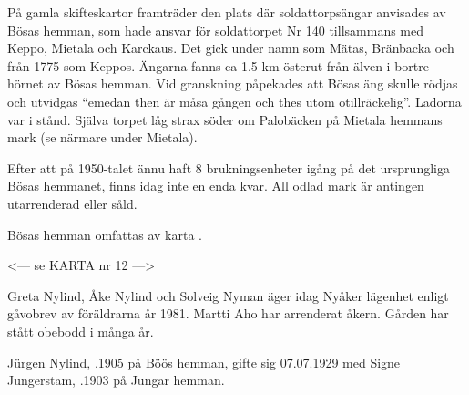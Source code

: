På gamla skifteskartor framträder den plats där soldattorpsängar anvisades av Bösas hemman, som hade ansvar för soldattorpet Nr 140 tillsammans med Keppo, Mietala och Karckaus. Det gick under namn som Mätas, Bränbacka och från 1775 som Keppos. Ängarna fanns ca 1.5 km österut från älven i bortre hörnet av Bösas hemman. Vid granskning påpekades att Bösas äng skulle rödjas och utvidgas ``emedan then är måsa gången och thes utom otillräckelig''. Ladorna var i stånd. Själva torpet låg strax söder om Palobäcken på Mietala hemmans mark (se närmare under Mietala).

Efter att på 1950-talet ännu haft 8 brukningsenheter igång på det ursprungliga Bösas hemmanet, finns idag inte en enda kvar. All odlad  mark är antingen  utarrenderad eller såld.

Bösas hemman omfattas av karta .

<--- se KARTA nr 12 --->



%


%
Greta Nylind, Åke Nylind och Solveig Nyman äger idag Nyåker lägenhet enligt gåvobrev av föräldrarna år 1981.
Martti Aho har arrenderat åkern. Gården har stått obebodd i många år.



%
Jürgen Nylind, .1905 på Böös hemman, gifte sig 07.07.1929 med Signe Jungerstam, .1903 på Jungar hemman.
\begin{jhchildren}
  \item {}
  \item {}
  \item {}
  \item {}
  \item {}
  \item {}
\end{jhchildren}

